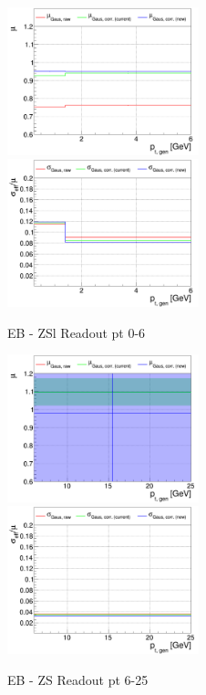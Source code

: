 \begin{figure}
\includegraphics[width=0.495\textwidth]{./plots_pdf/ECAL_plots/plotsPU/EB/ZS/pdf/GENPT/EBZS_GENPT_0000_0006_MuOverBins.pdf}
\includegraphics[width=0.495\textwidth]{./plots_pdf/ECAL_plots/plotsPU/EB/ZS/pdf/GENPT/EBZS_GENPT_0000_0006_EffSigmaOverBins.pdf}
\caption{EB - ZSl Readout pt 0-6}
\end{figure}

\begin{figure}
\includegraphics[width=0.495\textwidth]{./plots_pdf/ECAL_plots/plotsPU/EB/ZS/pdf/GENPT/EBZS_GENPT_0006_0025_MuOverBins.pdf}
\includegraphics[width=0.495\textwidth]{./plots_pdf/ECAL_plots/plotsPU/EB/ZS/pdf/GENPT/EBZS_GENPT_0006_0025_EffSigmaOverBins.pdf}
\caption{EB - ZS Readout pt 6-25}
\end{figure}

